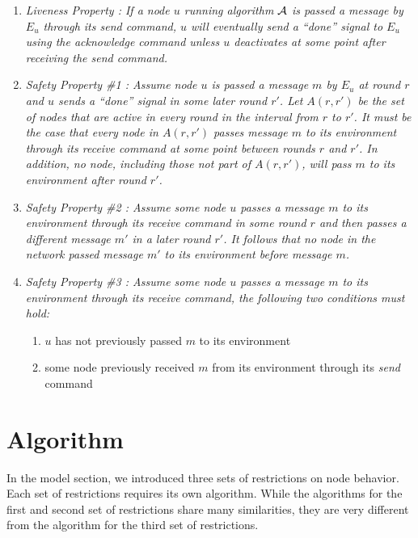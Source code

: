 \documentclass[english]{article}
\begin{document}
\begin {enumerate}
 
  \item \em Liveness Property \em: If a node $u$ running algorithm $\cal A$ is passed a message by $E_u$ through its \textit{send} command, $u$ will eventually send  a ``done'' signal to $E_u$ using the \textit{acknowledge} command unless $u$ deactivates at some point after receiving the \textit{send} command.

  \item \em Safety Property \#1 \em: Assume node $u$ is passed a message $m$ by $E_u$ at round $r$ and $u$ sends  a ``done'' signal in some later round $r'$. Let $A(r,r')$ be the set of nodes that are active in every round in the interval from $r$ to $r'$. It must be the case that every node in $A(r,r')$ passes message $m$ to its environment through its \textit{receive} command at some point between rounds $r$ and $r'$. In addition, no node, including those not part of $A(r,r')$, will pass $m$ to its environment after round $r'$. 

  \item \em Safety Property \#2 \em: Assume some node $u$ passes a message $m$ to its environment through its \textit{receive} command in some round $r$ and then passes a different message $m'$ in a later round $r'$. It follows that no node in the network passed message $m'$ to its environment before message $m$. 

  \item \em Safety Property \#3 \em: Assume some node $u$ passes a message $m$ to its environment through its \textit{receive} command, the following two conditions must hold:
  \begin {enumerate}
    \item $u$ has not previously passed $m$ to its environment
    \item some node previously received $m$ from its environment through its \textit{send} command
  \end{enumerate}

\end{enumerate}


\section{Algorithm}

In the model section, we introduced three sets of restrictions on node behavior. Each set of restrictions requires its own algorithm. While the algorithms for the first and second set of restrictions share many similarities, they are very different from the algorithm for the third set of restrictions.
\end{document}
